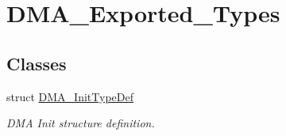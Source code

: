 \hypertarget{group__DMA__Exported__Types}{
\section{DMA\_\-Exported\_\-Types}
\label{group__DMA__Exported__Types}
}
\subsection*{Classes}
\begin{DoxyCompactItemize}
\item 
struct \hyperlink{structDMA__InitTypeDef}{DMA\_\-InitTypeDef}
\begin{DoxyCompactList}\small\item\em DMA Init structure definition. \item\end{DoxyCompactList}\end{DoxyCompactItemize}
